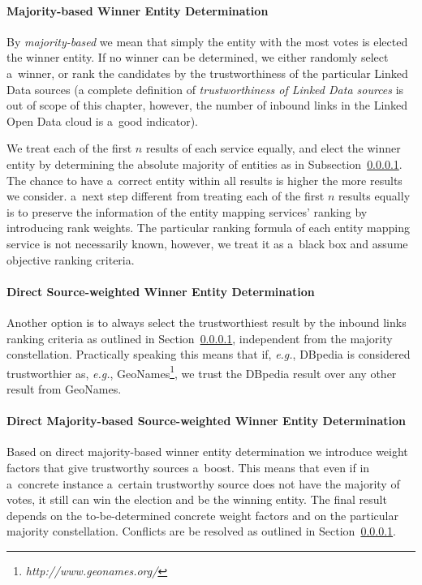 \paragraph{Majority-based Winner Entity Determination}\label{sec:direct}
By \textit{majority-based} we mean that simply the entity with the most votes is elected the winner entity. If no
winner can be determined, we either randomly select a~winner, or rank the candidates by the trustworthiness of the
particular Linked Data sources (a complete definition of \textit{trustworthiness of Linked Data sources} is out of
scope of this chapter, however, the number of inbound links in the Linked Open Data
cloud is a~good indicator).

We treat each of the first $n$ results of each service equally, and elect the winner entity by determining the
absolute majority of entities as in Subsection~\ref{sec:direct}. The chance to have a~correct entity within all results is
higher the more results we consider. a~next step different from treating each of the first $n$
results equally is to preserve the information of the entity mapping services' ranking by introducing rank
weights. The particular ranking formula of each entity mapping service is not necessarily known, however, we treat it as a~black box and assume objective ranking criteria.

\paragraph{Direct Source-weighted Winner Entity Determination}
Another option is to always select the trustworthiest result by the inbound links ranking criteria as outlined in Section~\ref{sec:direct}, independent from the majority constellation. Practically speaking this means that
if, \emph{e.g.}, DBpedia is considered trustworthier as, \emph{e.g.},  GeoNames\footnote{\textit{http://www.geonames.org/}}, we
trust the DBpedia result over any other result from GeoNames.

\paragraph{Direct Majority-based Source-weighted Winner Entity Determination}
Based on direct majority-based winner entity determination we introduce weight factors that give trustworthy
sources a~boost. This means that even if in a~concrete instance a~certain trustworthy source does not have the majority of votes, it still
can win the election and be the winning entity. The final result depends on the to-be-determined concrete
weight factors and on the particular majority constellation. Conflicts are be resolved as outlined in Section~\ref{sec:direct}.

